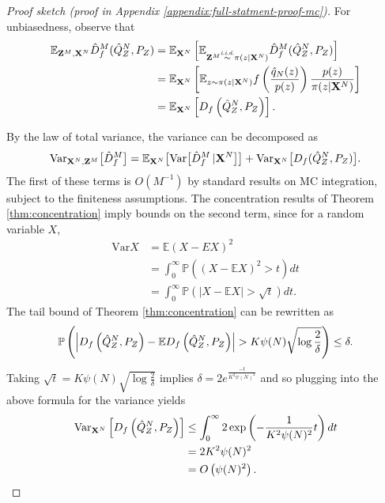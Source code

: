\begin{proof}[Proof sketch (proof in Appendix \ref{appendix:full-statment-proof-mc})]
For unbiasedness, observe that
\begin{align*}
    \mathbb{E}_{\mathbf{Z}^M, \mathbf{X}^N} \hat{D}^M_f( \hat{Q}_Z^N , P_Z)
    &=\mathbb{E}_{\mathbf{X}^N} \left[ \mathbb{E}_{\mathbf{Z}^M \overset{\text{\emph{i.i.d.}}}{\sim} \pi(z | \mathbf{X}^N)} \hat{D}^M_f( \hat{Q}_Z^N , P_Z)\right] \\
    &= \mathbb{E}_{\mathbf{X}^N} \left[ \mathbb{E}_{z \sim \pi(z | \mathbf{X}^N)} f\left(\frac{\hat{q}_N(z)}{p(z)} \right) \frac{p(z)}{\pi(z|\mathbf{X}^N)} \right] \\
    &=\mathbb{E}_{\mathbf{X}^N} \left[ D_f\left( \hat{Q}^N_Z , P_Z \right)\right].
\end{align*}

By the law of total variance, the variance can be decomposed as
\begin{align*}
    \text{Var}_{\mathbf{X}^N, \mathbf{Z}^M} \bigl[\hat{D}^M_f\bigr] = 
    \mathbb{E}_{\mathbf{X}^N} \bigl[\text{Var}\bigl[\hat{D}^M_f\, | \mathbf{X}^N\bigr]\bigr] + \text{Var}_{\mathbf{X}^N} \bigl[D_f( \hat{Q}_Z^N , P_Z )\bigr].
\end{align*}
The first of these terms is ${O( M^{-1})}$ by standard results on MC integration, subject to the finiteness assumptions.
The concentration results of Theorem \ref{thm:concentration} imply bounds on the second term, since for a random variable $X$,
\begin{align*}
    \text{Var}X &= \mathbb{E} (X - EX)^2 \\
    &= \int_0^\infty \mathbb{P}\left( (X - \mathbb{E} X)^2 > t \right) dt \\
    &= \int_0^\infty \mathbb{P} \left( \left| X - \mathbb{E} X \right| > \sqrt{t} \right) dt.
\end{align*}
The tail bound of Theorem \ref{thm:concentration} can be rewritten as 
\begin{align*}
\mathbb{P}\left(\left|D_f\left( \hat{Q}^N_Z , P_Z \right) - \mathbb{E} D_f\left( \hat{Q}^N_Z , P_Z \right) \right| > K\psi(N) \sqrt{\log \frac{2}{\delta}} \right) \leq \delta.
\end{align*}
Taking $\sqrt{t} = K\psi(N) \sqrt{\log \frac{2}{\delta}}$ implies $\delta = 2 e^{\frac{-t}{K^2 \psi(N)^2}}$ and so plugging into the above formula for the variance yields
\begin{align*}
    \text{Var}_{\mathbf{X}^N} \left[D_f\left( \hat{Q}^N_Z , P_Z \right)\right] 
    &\leq \int_0^\infty 2 \exp\left( -\frac{1}{K^2\psi(N)^2}t \right) dt\\
    &= 2 K^2 \psi(N)^2\\
    &= O\left(\psi(N)^2 \right).
\end{align*}
%
%
\end{proof}

